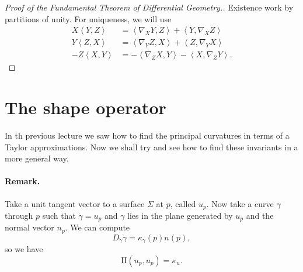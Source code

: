 \begin{proof}[Proof of the Fundamental Theorem of Differential Geometry.]
    Existence work by partitions of unity. For uniqueness, we will use
    \begin{align*}
        X \left\langle Y, Z \right\rangle &= \left\langle \nabla_X Y, Z \right\rangle + \left\langle Y, \nabla_X Z \right\rangle \\
        Y \left\langle Z, X \right\rangle &= \left\langle \nabla_Y Z, X \right\rangle + \left\langle Z, \nabla_Y X \right\rangle \\
        -Z \left\langle X, Y \right\rangle &= - \left\langle \nabla_Z X, Y \right\rangle - \left\langle X, \nabla_Z Y \right\rangle.
    \end{align*}

\end{proof}

\section{The shape operator}

In th previous lecture we saw how to find the principal curvatures in terms of a Taylor approximations. Now we shall try and see how to find these invariants in a more general way.

\paragraph{Remark.} Take a unit tangent vector to a surface \( \Sigma \) at \( p \), called \( u_p \). Now take a curve \( \gamma \) through \( p \) such that \( \dot{ \gamma } = u_p  \) and \( \gamma \) lies in the plane generated by \( u_p \) and the normal vector \( n_p \). We can compute
\[ 
    D_{ \dot{ \gamma } } \dot{\gamma} = \kappa_\gamma(p)n(p),
\]
so we have
\[ 
    \mathrm{I\!I}(u_p,u_p) = \kappa_u.
\]


